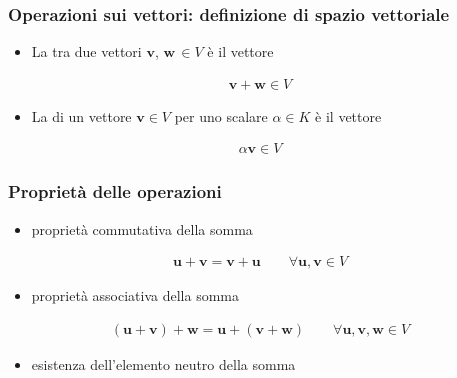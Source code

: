\documentclass[letterpaper,10pt,english]{jupyterBook}
\begin{document}
\subsubsection{Operazioni sui vettori: definizione di spazio vettoriale}
\label{\detokenize{ch/algebra/vector-algebra-def:operazioni-sui-vettori-definizione-di-spazio-vettoriale}}\begin{itemize}
\item {} 
\sphinxAtStartPar
La  tra due vettori \(\mathbf{v}\), \(\mathbf{w} \, \in V\) è il vettore

\end{itemize}
\begin{equation*}
\begin{split}\mathbf{v} + \mathbf{w} \in V\end{split}
\end{equation*}\begin{itemize}
\item {} 
\sphinxAtStartPar
La  di un vettore \(\mathbf{v} \in V\) per uno scalare \(\alpha \in K\) è il vettore

\end{itemize}
\begin{equation*}
\begin{split}\alpha \mathbf{v} \in V\end{split}
\end{equation*}\subsubsection*{Proprietà delle operazioni}
\begin{itemize}
\item {} 
\sphinxAtStartPar
proprietà commutativa della somma

\end{itemize}
\begin{equation*}
\begin{split}\mathbf{u} + \mathbf{v} = \mathbf{v} + \mathbf{u} \qquad \forall \mathbf{u}, \mathbf{v} \in V\end{split}
\end{equation*}\begin{itemize}
\item {} 
\sphinxAtStartPar
proprietà associativa della somma

\end{itemize}
\begin{equation*}
\begin{split}(\mathbf{u} + \mathbf{v}) + \mathbf{w} = \mathbf{u} + ( \mathbf{v} + \mathbf{w} ) \qquad \forall \mathbf{u}, \mathbf{v}, \mathbf{w} \in V\end{split}
\end{equation*}\begin{itemize}
\item {} 
\sphinxAtStartPar
esistenza dell’elemento neutro della somma

\end{itemize}
\end{document}
